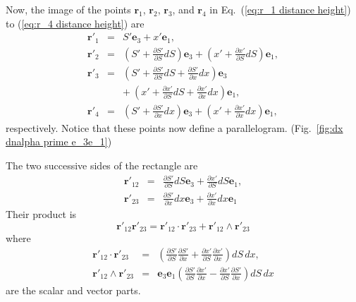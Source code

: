 \documentclass[11pt,twocolumn]{article}
\begin{document}
Now, the image of the points $\mathbf r_1$, $\mathbf r_2$, $\mathbf r_3$, and $\mathbf r_4$ in Eq.~(\ref{eq:r_1 distance height}) to (\ref{eq:r_4 distance height}) are 
\begin{eqnarray}
\label{eq:r'_1 distance height}
\mathbf r'_1&=&S'\mathbf e_3+x'\mathbf e_1,\\
\label{eq:r'_2 distance height}
\mathbf r'_2&=&(S'+\frac{\partial S'}{\partial S}dS)\mathbf e_3+(x'+\frac{\partial x'}{\partial S}dS)\mathbf e_1,\\
\label{eq:r'_3 distance height}
\mathbf r'_3&=&(S'+\frac{\partial S'}{\partial S}dS+\frac{\partial S'}{\partial x}dx)\mathbf e_3\nonumber\\
& &+\ (x'+\frac{\partial x'}{\partial S}dS+\frac{\partial x'}{\partial x}dx)\mathbf e_1,\\
\label{eq:r'_4 distance height}
\mathbf r'_4&=&(S'+\frac{\partial S'}{\partial x}dx)\mathbf e_3+(x'+\frac{\partial x'}{\partial x}dx)\mathbf e_1,
\end{eqnarray}
respectively.  Notice that these points now define a parallelogram.  (Fig.~\ref{fig:dx dnalpha prime e_3e_1})

The two successive sides of the rectangle are
\begin{eqnarray}
\label{eq:r'_12 distance height}
\mathbf r'_{12}&=&\frac{\partial S'}{\partial S}dS\mathbf e_3+\frac{\partial x'}{\partial S}dS\mathbf e_1,\\
\label{eq:r'_23 distance height}
\mathbf r'_{23}&=&\frac{\partial S'}{\partial x}dx\mathbf e_3+\frac{\partial x'}{\partial x}dx\mathbf e_1
\end{eqnarray}
Their product is
\begin{equation}
\label{eq:r'_12 r'_23 distance height}
\mathbf r'_{12}\mathbf r'_{23}=\mathbf r'_{12}\cdot\mathbf r'_{23}+\mathbf r'_{12}\wedge\mathbf r'_{23}
\end{equation}
where
\begin{eqnarray}
\label{eq:r_12 dot r_23 distance height}
\!\!\!\!\!\!\!\!\!\!\!\!\mathbf r'_{12}\!\!\cdot\mathbf r'_{23}\!\!\!\!&=&\!\!\!\!\left(\frac{\partial S'}{\partial S}\frac{\partial S'}{\partial x}+\frac{\partial x'}{\partial S}\frac{\partial x'}{\partial x}\right)dS\,dx,\\
\label{eq:r_12 wedge r_23 distance height}
\!\!\!\!\!\!\!\!\!\!\!\!\mathbf r'_{12}\!\!\wedge\mathbf r'_{23}\!\!\!\!&=&\!\!\!\!\mathbf e_3\mathbf e_1\left(\frac{\partial S'}{\partial S}\frac{\partial x'}{\partial x}-\frac{\partial x'}{\partial S}\frac{\partial S'}{\partial x}\right)dS\,dx
\end{eqnarray}
are the scalar and vector parts.
\end{document}
